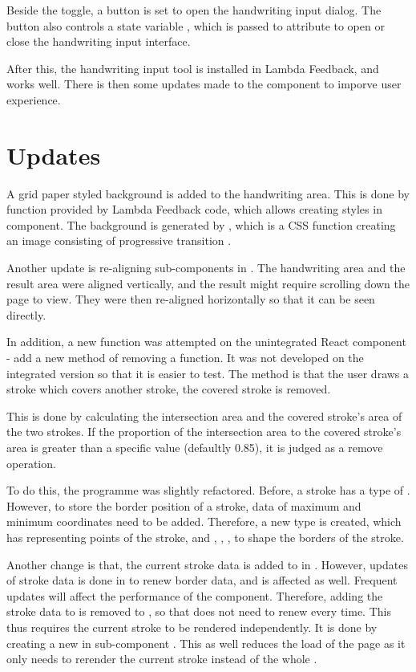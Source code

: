 \documentclass[12pt,twoside]{report}
\begin{document}
Beside the toggle, a button is set to open the handwriting input dialog. The
button also controls a state variable , which is passed to
attribute  to open or close the handwriting input interface.

After this, the handwriting input tool is installed in Lambda Feedback, and
works well. There is then some updates made to the component to imporve user
experience.

\section*{Updates}
\label{imp-updates}
A grid paper styled background is added to the handwriting area. This is done by
 function provided by Lambda Feedback code, which allows
creating styles in component. The background is generated by
, which is a CSS function creating an image consisting of
progressive transition \cite{web:gradientfunction}.

Another update is re-aligning sub-components in . The
handwriting area and the result area were aligned vertically, and the result
might require scrolling down the page to view. They were then re-aligned
horizontally so that it can be seen directly.

In addition, a new function was attempted on the unintegrated React component -
add a new method of removing a function. It was not developed on the integrated
version so that it is easier to test. The method is that the user draws a stroke which covers another stroke, the covered stroke is removed.

This is done by calculating the intersection area and the covered stroke's area of the two strokes. If the proportion of the intersection area to the covered stroke's area is greater than a specific value (defaultly 0.85), it is judged as a remove operation. 

To do this, the programme was slightly refactored. Before, a stroke has a type of . However, to store the border position of a stroke, data of maximum and minimum coordinates need to be added. Therefore, a new type  is created, which has  representing points of the stroke, and , , ,  to shape the borders of the stroke. 

Another change is that, the current stroke data is added to  in
 . However, updates of stroke data is done in
 to renew border data, and  is affected
as well. Frequent updates will affect the performance of the component.
Therefore, adding the stroke data to  is removed to
, so that  does not need to renew
 every time. This thus requires the current stroke to be
rendered independently. It is done by creating a new  in sub-component . This as well reduces the load of the page as it only needs to rerender the current stroke instead of the whole .
\end{document}
